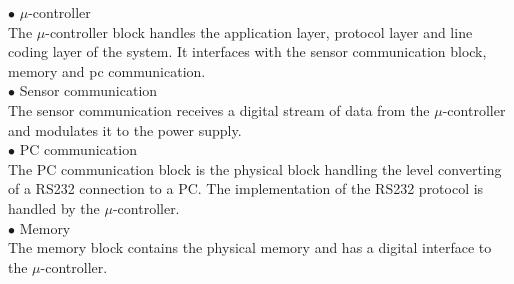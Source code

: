 \hspace*{.6cm}$\bullet$ $\mu$-controller\\
The $\mu$-controller block handles the application layer, protocol layer and line coding layer of the system. It interfaces with the sensor communication block, memory and pc communication.\\
\hspace*{.6cm}$\bullet$ Sensor communication\\
The sensor communication receives a digital stream of data from the $\mu$-controller and modulates it to the power supply.\\
\hspace*{.6cm}$\bullet$ PC communication\\
The PC communication block is the physical block handling the level converting of a RS232 connection to a PC. The implementation of the RS232 protocol is handled by the $\mu$-controller.\\
\hspace*{.6cm}$\bullet$ Memory\\
The memory block contains the physical memory and has a digital interface to the $\mu$-controller.

